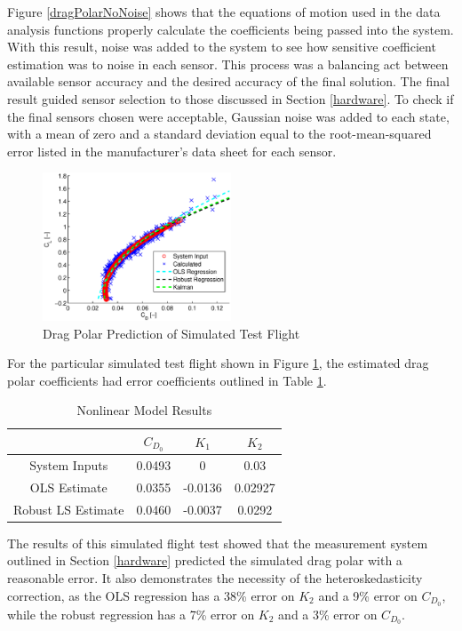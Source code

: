 Figure \ref{dragPolarNoNoise} shows that the equations of motion used in the data analysis functions properly calculate the coefficients being passed into the system. With this result, noise was added to the system to see how sensitive coefficient estimation was to noise in each sensor. This process was a balancing act between available sensor accuracy and the desired accuracy of the final solution. The final result guided sensor selection to those discussed in Section \ref{hardware}. To check if the final sensors chosen were acceptable, Gaussian noise was added to each state, with a mean of zero and a standard deviation equal to the root-mean-squared error listed in the manufacturer's data sheet for each sensor.
\begin{figure}[H]

  \centering
    \includegraphics[width=0.5\textwidth]{figures/simDragPolarNoise.eps}
      \caption{Drag Polar Prediction of Simulated Test Flight} \label{dragPolarNoise}
\end{figure}

For the particular simulated test flight shown in Figure \ref{dragPolarNoise}, the estimated drag polar coefficients had error coefficients outlined in Table \ref{simCoeffErrorTable}.

\begin{table}[ht]
\caption{Nonlinear Model Results} %
\centering %
\begin{tabular}{c c c c} %
\hline\hline %
 & $C_{D_0}$ & $K_1$ & $K_2$ \\ [0.5ex] %
\hline %
System Inputs & 0.0493 & 0 & 0.03 \\ %
OLS Estimate & 0.0355 & -0.0136 & 0.02927 \\
Robust LS Estimate & 0.0460 & -0.0037 & 0.0292 \\ [1ex] %
\hline %
\end{tabular}
\label{simCoeffErrorTable} %
\end{table}
The results of this simulated flight test showed that the measurement system outlined in Section \ref{hardware} predicted the simulated drag polar with a reasonable error. It also demonstrates the necessity of the heteroskedasticity correction, as the OLS regression has a 38\% error on $K_2$ and a 9\% error on $C_{D_0}$, while the robust regression has a 7\% error on $K_2$ and a 3\% error on $C_{D_0}$.